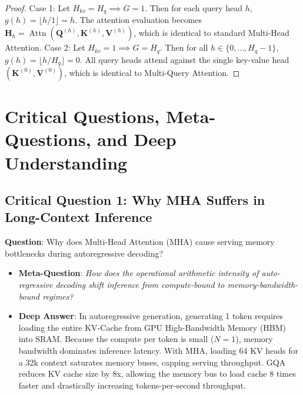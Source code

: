 \documentclass[11pt,a4paper]{article}
\theoremstyle{definition}
\begin{document}
\begin{proof}
Case 1: Let $H_{kv} = H_q \implies G = 1$.
Then for each query head $h$, $g(h) = \lfloor h / 1 \rfloor = h$.
The attention evaluation becomes $\mathbf{H}_h = \operatorname{Attn}(\mathbf{Q}^{(h)}, \mathbf{K}^{(h)}, \mathbf{V}^{(h)})$, which is identical to standard Multi-Head Attention.
Case 2: Let $H_{kv} = 1 \implies G = H_q$.
Then for all $h \in \{0, \dots, H_q - 1\}$, $g(h) = \lfloor h / H_q \rfloor = 0$.
All query heads attend against the single key-value head $(\mathbf{K}^{(0)}, \mathbf{V}^{(0)})$, which is identical to Multi-Query Attention.
\end{proof}

\section{Critical Questions, Meta-Questions, and Deep Understanding}

\subsection{\textbf{Critical Question 1: Why MHA Suffers in Long-Context Inference}}
\textbf{Question}: Why does Multi-Head Attention (MHA) cause serving memory bottlenecks during autoregressive decoding?
\begin{itemize}
    \item \textbf{Meta-Question}: \emph{How does the operational arithmetic intensity of auto-regressive decoding shift inference from compute-bound to memory-bandwidth-bound regimes?}
    \item \textbf{Deep Answer}: In autoregressive generation, generating 1 token requires loading the entire KV-Cache from GPU High-Bandwidth Memory (HBM) into SRAM. Because the compute per token is small ($N=1$), memory bandwidth dominates inference latency. With MHA, loading 64 KV heads for a 32k context saturates memory buses, capping serving throughput. GQA reduces KV cache size by 8x, allowing the memory bus to load cache 8 times faster and drastically increasing tokens-per-second throughput.
\end{itemize}
\end{document}
